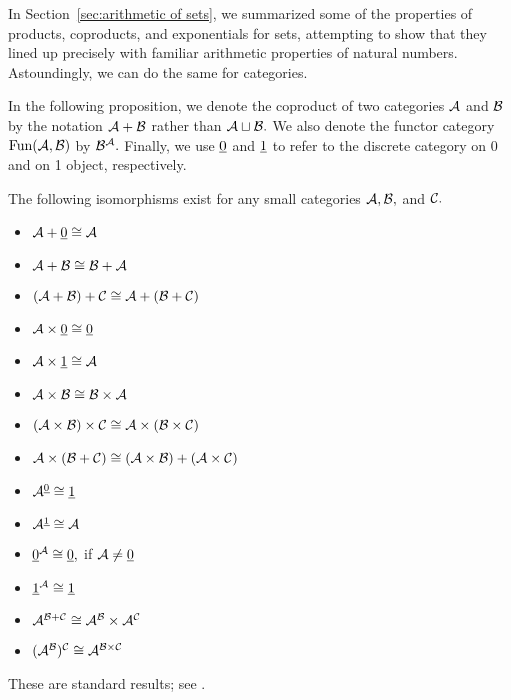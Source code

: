 \documentclass[CT4S-EN-RU]{subfiles}
\begin{document}
\begin{blockENG}
In Section~\ref{sec:arithmetic of sets}, we summarized some of the properties of products, coproducts, and exponentials for sets, attempting to show that they lined up precisely with familiar arithmetic properties of natural numbers. Astoundingly, we can do the same for categories.
\end{blockENG}

\begin{blockRUS}
\end{blockRUS}

\begin{blockENG}
In the following proposition, we denote the coproduct of two categories $\mathcal{A}$ and $\mathcal{B}$ by the notation $\mathcal{A}+\mathcal{B}$ rather than $\mathcal{A}\sqcup\mathcal{B}.$ We also denote the functor category $\textnormal{Fun}(\mathcal{A},\mathcal{B})$ by $\mathcal{B}^\mathcal{A}.$ Finally, we use $\underline{0}$ and $\underline{1}$ to refer to the discrete category on 0 and on 1 object, respectively.
\end{blockENG}

\begin{blockRUS}
\end{blockRUS}

\begin{propositionENG}\label{prop:arithmetic of cats}
The following isomorphisms exist for any small categories $\mathcal{A},\mathcal{B},$ and $\mathcal{C}.$

\begin{itemize}
\item $\mathcal{A}+\underline{0}\cong \mathcal{A}$
\item $\mathcal{A} + \mathcal{B}\cong \mathcal{B} + \mathcal{A}$
\item $(\mathcal{A} + \mathcal{B}) + \mathcal{C} \cong \mathcal{A} + (\mathcal{B} + \mathcal{C})$
\item $\mathcal{A}\times\underline{0}\cong\underline{0}$
\item $\mathcal{A}\times\underline{1}\cong \mathcal{A}$
\item $\mathcal{A}\times \mathcal{B}\cong \mathcal{B}\times \mathcal{A}$
\item $(\mathcal{A}\times\mathcal{B})\times\mathcal{C}\cong\mathcal{A}\times(\mathcal{B}\times\mathcal{C})$
\item $\mathcal{A}\times(\mathcal{B}+\mathcal{C})\cong (\mathcal{A}\times \mathcal{B})+(\mathcal{A}\times \mathcal{C})$
\item $\mathcal{A}^{\underline{0}}\cong \underline{1}$
\item $\mathcal{A}^{\underline{1}}\cong \mathcal{A}$
\item $\underline{0}^\mathcal{A}\cong\underline{0},$\;\; if $\mathcal{A}\neq\underline{0}$
\item $\underline{1}^\mathcal{A}\cong\underline{1}$
\item $\mathcal{A}^{\mathcal{B}+\mathcal{C}}\cong \mathcal{A}^\mathcal{B}\times \mathcal{A}^\mathcal{C}$
\item $(\mathcal{A}^\mathcal{B})^\mathcal{C}\cong \mathcal{A}^{\mathcal{B}\times \mathcal{C}}$
\end{itemize}
\end{propositionENG}

\begin{propositionRUS}\label{prop:arithmetic of cats}
\end{propositionRUS}

\begin{proofENG}
These are standard results; see \cite{Mac}.
\end{proofENG}

\begin{proofRUS}
\end{proofRUS}
\end{document}
